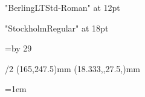 \fontfam[berlingnova]
\font\berlinglt "BerlingLTStd-Roman" at 12pt\berlinglt
{}\currvar

\font\stockholm "StockholmRegular" at 18pt\relax

\typosize[10.5/15.71]

\svlang

\hsize=110mm
\vsize=\topskip \advance \vsize by 29\baselineskip

\margins/2 (165,247.5)mm (18.333,,27.5,)mm

\parskip=0pt
\parindent=1em

\baselineskip

\def\capsspace{\hskip0.1em}



\def\birth{*}
\def\death{†}
\def\marriage{{\font\libertinus=LibertinusSerif-Regular scaled 2500\relax
    \libertinus
    \char"26AD\relax}%
}


\def\chapfont{}

\def\chapS#1#2{%
    \vfil\supereject
    \vglue\baselineskip
    \centerline{{%
        \scalemain\typoscale[1200/]
        \currvar \it
        \relax#1%
    }}%
    \vskip0.5\baselineskip
    \centerline{
        \font\ebgaramond=EBGaramond12-Regular scaled 1440\relax
        \ebgaramond
        \char"2766%
    }%
    \vskip0.5\baselineskip    
    \centerline{%
        \scalemain\typoscale[1000/]%
        \it
        #2%
    }%
    \vskip3\baselineskip
    \_firstnoindent
}

\def\chapT#1#2#3#4#5{%
    \vfil\supereject
    \vglue\baselineskip
    {%
    \leftskip 0pt plus 1fill\relax
    \rightskip=\leftskip\relax
    \leavevmode
    \llap{%
        #1%
        \quad\quad
    }
    \null
    \rlap{%
        \quad\quad
        #3%
    }\par
    \leavevmode
    \llap{%
        #2%
        \quad\quad
    }
    \null
    \rlap{%
        \quad\quad 
        #4%
    }\par
    }%
    \vskip-1.5\baselineskip
\hbox to \hsize{\hss\marriage\hss}%
    \vskip2.5\baselineskip
    \_firstnoindent
}

